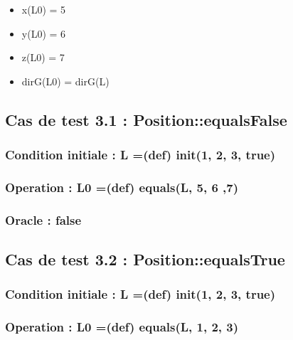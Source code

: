 \documentclass[11pt]{article}
\begin{document}
\begin{itemize}

\item x(L0) = 5\\
\label{sec-1.7.3.1}


\item y(L0) = 6\\
\label{sec-1.7.3.2}


\item z(L0) = 7\\
\label{sec-1.7.3.3}


\item dirG(L0) = dirG(L)\\
\label{sec-1.7.3.4}




\end{itemize} %
\subsection{Cas de test 3.1 : Position::equalsFalse}
\label{sec-1.8}

\subsubsection{Condition initiale : L =(def) init(1, 2, 3, true)}
\label{sec-1.8.1}

\subsubsection{Operation : L0 =(def) equals(L, 5, 6 ,7)}
\label{sec-1.8.2}

\subsubsection{Oracle : false}
\label{sec-1.8.3}


\subsection{Cas de test 3.2 : Position::equalsTrue}
\label{sec-1.9}

\subsubsection{Condition initiale : L =(def) init(1, 2, 3, true)}
\label{sec-1.9.1}

\subsubsection{Operation : L0 =(def) equals(L, 1, 2, 3)}
\label{sec-1.9.2}
\end{document}
